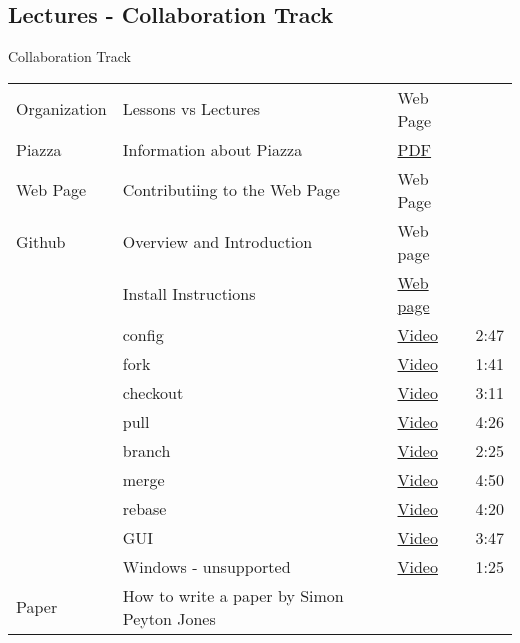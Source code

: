 


\subsection{Lectures - Collaboration Track}
\label{\detokenize{i524/lectures:lectures-collaboration-track}}

\begin{threeparttable}
\capstart\caption{Collaboration Track}\label{\detokenize{i524/lectures:id64}}
\noindent\begin{tabulary}{\linewidth}{|L|L|L|L|}
\hline
{}\relax &\relax &\relax &\relax \\
\hline
Organization
&
Lessons vs Lectures
&
Web Page
&\\
\hline
Piazza
&
Information about Piazza
&
\href{https://piazza.com/pdfs/piazza\_product\_introduction.pdf}{PDF}
&\\
\hline
Web Page
&
Contributiing to the Web Page
&
Web Page
&\\
\hline
Github
&
Overview and Introduction
&
Web page
&\\
\hline&
Install Instructions
&
\href{https://www.atlassian.com/git/tutorials/install-git}{Web page}
&\\
\hline&
config
&
\href{https://www.youtube.com/watch?v=ZChtKFLiaNw}{Video}
&
2:47
\\
\hline&
fork
&
\href{https://www.youtube.com/watch?v=5oJHRbqEofs}{Video}
&
1:41
\\
\hline&
checkout
&
\href{https://www.youtube.com/watch?v=HwrPhOp6-aM}{Video}
&
3:11
\\
\hline&
pull
&
\href{https://www.youtube.com/watch?v=d5wpJ5VimSU}{Video}
&
4:26
\\
\hline&
branch
&
\href{https://www.youtube.com/watch?v=H5GJfcp3p4Q}{Video}
&
2:25
\\
\hline&
merge
&
\href{https://www.youtube.com/watch?v=yyLiplDQtf0}{Video}
&
4:50
\\
\hline&
rebase
&
\href{https://www.youtube.com/watch?v=SxzjZtJwOgo}{Video}
&
4:20
\\
\hline&
GUI
&
\href{https://www.youtube.com/watch?v=BMYOs5jflGE}{Video}
&
3:47
\\
\hline&
Windows - unsupported
&
\href{https://www.youtube.com/watch?v=YBbkvCrfDSo}{Video}
&
1:25
\\
\hline
Paper
&
How to write a paper by Simon Peyton Jones

\end{tabulary}
\end{threeparttable}
